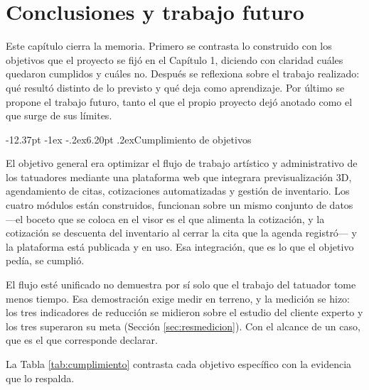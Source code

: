 \documentclass[12pt,letterpaper,oneside]{report}
\makeatletter
\renewcommand\section{\@startsection{section}{1}{\z@}%
  {-12.37pt \@plus -1ex \@minus -.2ex}{6.20pt \@plus.2ex}{\normalfont\large\bfseries}}
\makeatother
\begin{document}
\chapter{Conclusiones y trabajo futuro}

Este capítulo cierra la memoria. Primero se contrasta lo construido con los objetivos que el proyecto se fijó en el Capítulo 1, diciendo con claridad cuáles quedaron cumplidos y cuáles no. Después se reflexiona sobre el trabajo realizado: qué resultó distinto de lo previsto y qué deja como aprendizaje. Por último se propone el trabajo futuro, tanto el que el propio proyecto dejó anotado como el que surge de sus límites.

\section{Cumplimiento de objetivos}

El objetivo general era optimizar el flujo de trabajo artístico y administrativo de los tatuadores mediante una plataforma web que integrara previsualización 3D, agendamiento de citas, cotizaciones automatizadas y gestión de inventario. Los cuatro módulos están construidos, funcionan sobre un mismo conjunto de datos —el boceto que se coloca en el visor es el que alimenta la cotización, y la cotización se descuenta del inventario al cerrar la cita que la agenda registró— y la plataforma está publicada y en uso. Esa integración, que es lo que el objetivo pedía, se cumplió.

 El flujo esté unificado no demuestra por sí solo que el trabajo del tatuador tome menos tiempo. Esa demostración exige medir en terreno, y la medición se hizo: los tres indicadores de reducción se midieron sobre el estudio del cliente experto y los tres superaron su meta (Sección \ref{sec:resmedicion}). Con el alcance de un caso, que es el que corresponde declarar.

La Tabla \ref{tab:cumplimiento} contrasta cada objetivo específico con la evidencia que lo respalda.
\end{document}
